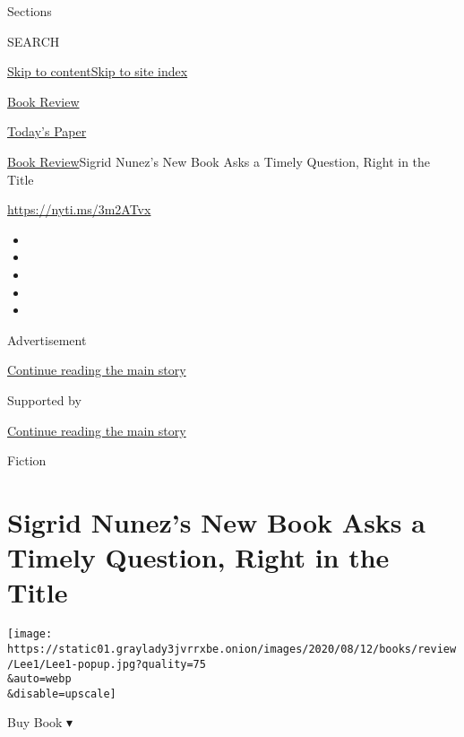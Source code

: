 Sections

SEARCH

\protect\hyperlink{site-content}{Skip to
content}\protect\hyperlink{site-index}{Skip to site index}

\href{https://www.nytimes3xbfgragh.onion/section/books/review}{Book
Review}

\href{https://myaccount.nytimes3xbfgragh.onion/auth/login?response_type=cookie\&client_id=vi}{}

\href{https://www.nytimes3xbfgragh.onion/section/todayspaper}{Today's
Paper}

\href{/section/books/review}{Book Review}\textbar{}Sigrid Nunez's New
Book Asks a Timely Question, Right in the Title

\url{https://nyti.ms/3m2ATvx}

\begin{itemize}
\item
\item
\item
\item
\item
\end{itemize}

Advertisement

\protect\hyperlink{after-top}{Continue reading the main story}

Supported by

\protect\hyperlink{after-sponsor}{Continue reading the main story}

Fiction

\hypertarget{sigrid-nunezs-new-book-asks-a-timely-question-right-in-the-title}{%
\section{Sigrid Nunez's New Book Asks a Timely Question, Right in the
Title}\label{sigrid-nunezs-new-book-asks-a-timely-question-right-in-the-title}}

\texttt{[image: https://static01.graylady3jvrrxbe.onion/images/2020/08/12/books/review/Lee1/Lee1-popup.jpg?quality=75\\\&auto=webp\\\&disable=upscale]}

Buy Book ▾

